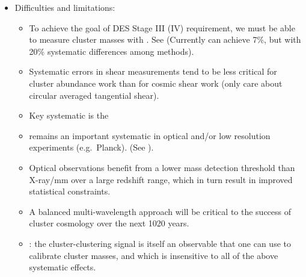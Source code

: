 \documentclass[letterpaper,10pt,english]{sphinxmanual}
\begin{document}
\begin{itemize}
\begin{itemize}
\begin{itemize}
\end{itemize}

\item {} 
Difficulties and limitations:
\begin{itemize}
\item {} 
To achieve the goal of DES Stage III (IV) requirement, we must
be able to measure cluster masses with .
See 
(Currently can achieve 7\%, but with 20\% systematic differences
among methods).

\item {} 
Systematic errors in shear measurements tend to be less
critical for cluster abundance work than for cosmic shear work
(only care about circular averaged tangential shear).

\item {} 
Key systematic is the 

\item {} 
 remains an important systematic in
optical and/or low resolution experiments (e.g. Planck). (See
).

\item {} 
Optical observations benefit from a lower mass detection
threshold than X-ray/mm over a large redshift range, which in
turn result in improved statistical constraints.

\item {} 
 A balanced multi-wavelength approach will be
critical to the success of cluster cosmology over the next
10\textendash{}20 years.

\item {} 
: the cluster-clustering signal is itself
an observable that one can use to calibrate cluster masses, and
which is insensitive to all of the above systematic effects.

\end{itemize}

\end{itemize}


\end{itemize}
\end{document}
